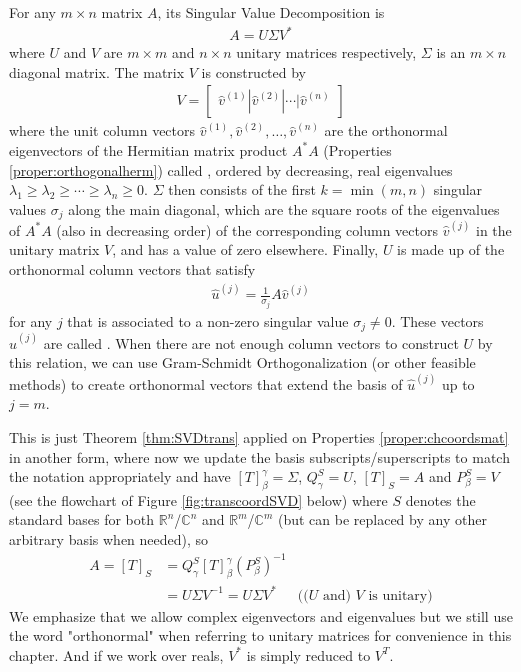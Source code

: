 \begin{thm}
\label{thm:SVD}
For any $m \times n$ matrix $A$, its Singular Value Decomposition is
\begin{align}
A = U\Sigma V^*
\end{align}
where $U$ and $V$ are $m \times m$ and $n \times n$ unitary matrices respectively, $\Sigma$ is an $m \times n$ diagonal matrix. The matrix $V$ is constructed by
\begin{align}
V = 
\begin{bmatrix}
\hat{v}^{(1)} | \hat{v}^{(2)} | \cdots | \hat{v}^{(n)}
\end{bmatrix}
\end{align}
where the unit column vectors $\hat{v}^{(1)}, \hat{v}^{(2)}, \ldots, \hat{v}^{(n)}$ are the orthonormal eigenvectors of the Hermitian matrix product $A^*A$ (Properties \ref{proper:orthogonalherm}) called , ordered by decreasing, real eigenvalues $\lambda_1 \geq \lambda_2 \geq \cdots \geq \lambda_n \geq 0$. $\Sigma$ then consists of the first $k = \min(m,n)$ singular values $\sigma_j$ along the main diagonal, which are the square roots of the eigenvalues of $A^*A$ (also in decreasing order) of the corresponding column vectors $\hat{v}^{(j)}$ in the unitary matrix $V$, and has a value of zero elsewhere. Finally, $U$ is made up of the orthonormal column vectors that satisfy
\begin{align}
\hat{u}^{(j)} = \frac{1}{\sigma_j} A\hat{v}^{(j)}
\end{align}
for any $j$ that is associated to a non-zero singular value $\sigma_j \neq 0$. These vectors $\hat{u}^{(j)}$ are called . When there are not enough column vectors to construct $U$ by this relation, we can use Gram-Schmidt Orthogonalization (or other feasible methods) to create orthonormal vectors that extend the basis of $\hat{u}^{(j)}$ up to $j = m$.
\end{thm}
This is just Theorem \ref{thm:SVDtrans} applied on Properties \ref{proper:chcoordsmat} in another form, where now we update the basis subscripts/superscripts to match the notation appropriately and have $[T]^{\gamma}_{\beta} = \Sigma$, $Q_{\gamma}^{S} = U$, $[T]_{S} = A$ and $P_{\beta}^{S} = V$ (see the flowchart of Figure \ref{fig:transcoordSVD} below) where $S$ denotes the standard bases for both $\mathbb{R}^n$/$\mathbb{C}^n$ and $\mathbb{R}^m$/$\mathbb{C}^m$ (but can be replaced by any other arbitrary basis when needed), so
\begin{align*}
A = [T]_S &= Q_{\gamma}^{S}[T]^{\gamma}_{\beta}(P_{\beta}^{S})^{-1} \\
&= U\Sigma V^{-1} = U\Sigma V^* & \text{(($U$ and) $V$ is unitary)}
\end{align*}
We emphasize that we allow complex eigenvectors and eigenvalues but we still use the word "orthonormal" when referring to unitary matrices for convenience in this chapter. And if we work over reals, $V^*$ is simply reduced to $V^T$.

